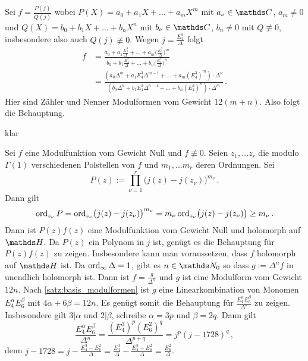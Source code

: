 \begin{bewe-list}
	\item[(iii) $\Rightarrow$ (ii)] Sei $f = \frac{P(j)}{Q(j)}$ wobei $P(X) = a_0 + a_1X + \ldots + a_mX^m$ mit $a_\nu \in \CC$, $a_m \not= 0$ und $Q(X) = b_0 + b_1X + \ldots + b_nX^n$ mit $b_\nu \in \CC$, $b_n \not= 0$ mit $Q \not\equiv 0$, insbesondere also auch $Q(j) \not\equiv 0$.
	Wegen $j = \frac{E_4^3}{\Delta}$ folgt
	\begin{align*}
	f
	&= \frac{a_0 + a_1\frac{E_4^3}{\Delta} + \ldots + a_m\bigl(\frac{E_4^3}{\Delta}\bigr)^m}{b_0 + b_1\frac{E_4^3}{\Delta} + \ldots + b_n\bigl(\frac{E_4^3}{\Delta}\bigr)^n} \\
	&= \frac{(a_0\Delta^m + a_1E_4^3\Delta^{m-1} + \ldots + a_m(E_4^3)^m)\cdot \Delta^n}{(b_0\Delta^n + b_1E_4^3\Delta^{n-1} + \ldots + b_n(E_4^3)^n) \cdot \Delta^m}
	\,.
	\end{align*}
	Hier sind Zähler und Nenner Modulformen vom Gewicht $12(m+n)$.
	Also folgt die Behauptung.
	
	\item[(ii) $\Rightarrow$ (i)] klar
	
	\item[(i) $\Rightarrow$ (iii)] Sei $f$ eine Modulfunktion vom Gewicht Null und $f \not\equiv 0$.
	Seien $z_1, \ldots z_r$ die modulo $\Gamma(1)$ verschiedenen Polstellen von $f$ und $m_1, \ldots m_r$ deren Ordnungen.
	Sei
	\[
	P(z)
	:= \prod_{\nu = 1}^r \bigl(j(z) - j(z_\nu)\bigr)^{m_\nu}
	\,.
	\]
	Dann gilt
	\[
	\operatorname{ord}_{z_\nu} P
	= \operatorname{ord}_{z_\nu} \bigl(j(z) - j(z_\nu)\bigr)^{m_\nu}
	= m_\nu \operatorname{ord}_{z_\nu} \bigl(j(z) - j(z_\nu)\bigr)
	\geq m_\nu
	\,.
	\]
	Dann ist $P(z)f(z)$ eine Modulfunktion vom Gewicht Null und holomorph auf $\HH$.
	Da $P(z)$ ein Polynom in $j$ ist, genügt es die Behauptung für $P(z)f(z)$ zu zeigen.
	Insbesondere kann man voraussetzen, dass $f$ holomorph auf $\HH$ ist.
	Da $\operatorname{ord}_\infty \Delta = 1$, gibt es $n\in\NN_0$ so dass $g := \Delta^nf$ in unendlich holomorph ist.
	Dann ist $f = \frac{g}{\Delta^n}$ und $g$ ist eine Modulform vom Gewicht $12n$.
	Nach \autoref{satz:basis_modulformen} ist $g$ eine Linearkombination von Monomen $E_4^\alpha E_6^\beta$ mit $4\alpha + 6\beta = 12n$.
	Es genügt somit die Behauptung für $\frac{E_4^\alpha E_6^\beta}{\Delta^n}$ zu zeigen.
	Insbesondere gilt $3|\alpha$ und $2|\beta$, schreibe $\alpha = 3p$ und $\beta = 2q$.
	Dann gilt
	\[
	\frac{E_4^\alpha E_6^\beta}{\Delta^n}
	= \frac{(E_4^3)^p (E_6^2)^q}{\Delta^{p+q}}
	= j^p (j-1728)^q
	\,,
	\]
	denn $j-1728 = j - \frac{E_4^3 - E_6^2}{\Delta} = \frac{E_4^3}{\Delta} - \frac{E_4^3-E_6^2}{\Delta} = \frac{E_6^2}{\Delta}$.
\end{bewe-list}

